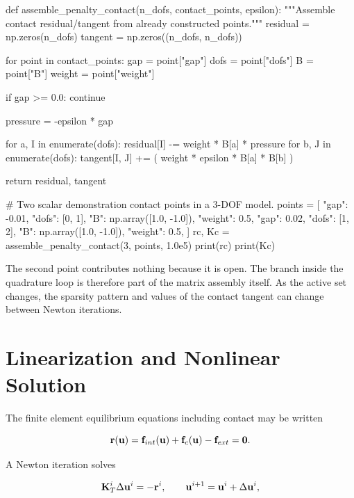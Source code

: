 \begin{python}
def assemble_penalty_contact(n_dofs, contact_points, epsilon):
    """Assemble contact residual/tangent from already constructed points."""
    residual = np.zeros(n_dofs)
    tangent = np.zeros((n_dofs, n_dofs))

    for point in contact_points:
        gap = point["gap"]
        dofs = point["dofs"]
        B = point["B"]
        weight = point["weight"]

        if gap >= 0.0:
            continue

        pressure = -epsilon * gap

        for a, I in enumerate(dofs):
            residual[I] -= weight * B[a] * pressure
            for b, J in enumerate(dofs):
                tangent[I, J] += (
                    weight * epsilon * B[a] * B[b]
                )

    return residual, tangent


# Two scalar demonstration contact points in a 3-DOF model.
points = [
    {"gap": -0.01, "dofs": [0, 1],
     "B": np.array([1.0, -1.0]), "weight": 0.5},
    {"gap":  0.02, "dofs": [1, 2],
     "B": np.array([1.0, -1.0]), "weight": 0.5},
]
rc, Kc = assemble_penalty_contact(3, points, 1.0e5)
print(rc)
print(Kc)
\end{python}

The second point contributes nothing because it is open. The branch inside the
quadrature loop is therefore part of the matrix assembly itself. As the active
set changes, the sparsity pattern and values of the contact tangent can change
between Newton iterations.

\section{Linearization and Nonlinear Solution}

The finite element equilibrium equations including contact may be written

\begin{equation}\label{contact-global-equilibrium}
    \mathbf{r}(\mathbf{u}) =
    \mathbf{f}_{int}(\mathbf{u})
    + \mathbf{f}_c(\mathbf{u})
    - \mathbf{f}_{ext} = \mathbf{0}.
\end{equation}

A Newton iteration solves

\begin{equation}\label{contact-newton-system}
    \mathbf{K}_T^i \Delta \mathbf{u}^i = -\mathbf{r}^i,
    \qquad
    \mathbf{u}^{i+1}=\mathbf{u}^i+\Delta \mathbf{u}^i,
\end{equation}

